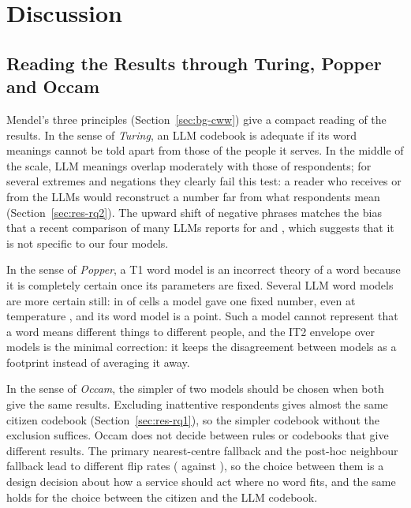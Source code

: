\section{Discussion}
\label{sec:discussion}

\subsection{Reading the Results through Turing, Popper and Occam}
\label{sec:disc-mendel}

Mendel's three principles (Section~\ref{sec:bg-cww}) give a compact reading of the results.
In the sense of \emph{Turing}, an LLM codebook is adequate if its word meanings cannot be told apart from those of
the people it serves.
In the middle of the scale, LLM meanings overlap moderately with those of respondents; for several extremes and negations
they clearly fail this test:
a reader who receives  or  from the LLMs would reconstruct a number far from what
respondents mean (Section~\ref{sec:res-rq2}).
The upward shift of negative phrases matches the bias that a recent comparison of many LLMs reports for
 and  \citep{petridis2026unlikely}, which suggests that it is not specific to our four
models.

In the sense of \emph{Popper}, a T1 word model is an incorrect theory of a word because it is completely certain once
its parameters are fixed.
Several LLM word models are more certain still: in \WtwoCollapsesPOne{} of \WtwoCellsPOne{} cells a model gave one fixed
number, even at temperature \WTemperature{}, and its word model is a point.
Such a model cannot represent that a word means different things to different people, and the IT2 envelope over models
is the minimal correction: it keeps the disagreement between models as a footprint instead of averaging it away.

In the sense of \emph{Occam}, the simpler of two models should be chosen when both give the same results.
Excluding inattentive respondents gives almost the same citizen codebook (Section~\ref{sec:res-rq1}), so the simpler
codebook without the exclusion suffices.
Occam does not decide between rules or codebooks that give different results.
The primary nearest-centre fallback and the post-hoc neighbour fallback lead to different flip rates
(\WthreeActionFlipRateLlmVsCitizen{} against \WthreePosthocBSevereNeighbourFallbackActionFlipRateLlmVsCitizen{}), so the
choice between them is a design decision about how a service should act where no word fits, and the same holds for the
choice between the citizen and the LLM codebook.

